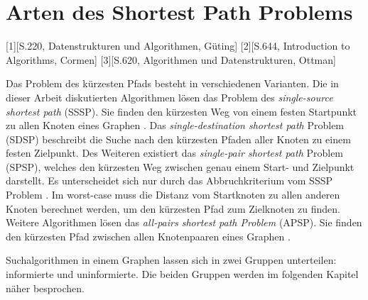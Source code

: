 \section{Arten des Shortest Path Problems}


[1][S.220, Datenstrukturen und Algorithmen, Güting]
[2][S.644, Introduction to Algorithms, Cormen]
[3][S.620, Algorithmen und Datenstrukturen, Ottman]


Das Problem des kürzesten Pfads besteht in verschiedenen Varianten. Die in dieser Arbeit diskutierten Algorithmen lösen das Problem des \textit{single-source shortest path} (SSSP). Sie finden den kürzesten Weg von einem festen Startpunkt zu allen Knoten eines Graphen \cite{Gu.2018}. Das \textit{single-destination shortest path} Problem (SDSP)  beschreibt die Suche nach den kürzesten Pfaden aller Knoten zu einem festen Zielpunkt. Des Weiteren existiert das \textit{single-pair shortest path} Problem (SPSP), welches den kürzesten Weg zwischen genau einem Start- und Zielpunkt darstellt. Es unterscheidet sich nur durch das Abbruchkriterium vom SSSP Problem \cite{Ottmann.2017}. Im worst-case muss die Distanz vom Startknoten zu allen anderen Knoten berechnet werden, um den kürzesten Pfad zum Zielknoten zu finden. Weitere Algorithmen lösen das \textit{all-pairs shortest path Problem} (APSP). Sie finden den kürzesten Pfad zwischen allen Knotenpaaren eines Graphen \cite{Cormen.2009}.



Suchalgorithmen in einem Graphen lassen sich in zwei Gruppen unterteilen: informierte und uninformierte. Die beiden Gruppen werden im folgenden Kapitel näher besprochen.
